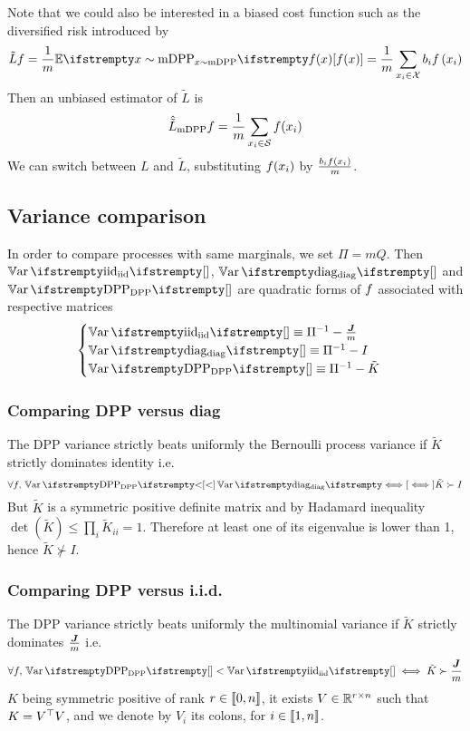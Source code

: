 Note that we could also be interested in a biased cost function such as the diversified risk introduced by \cite{zhang2017dppminibatch}
$$
\tilde L{\query} =\frac{1}{m}\EE{x \sim \textrm{mDPP}}{\query(x)}=\frac{1}{m}\sum_{x_i \in \mathcal X} b_{i} \query\left(x_{i}\right)
$$
Then an unbiased estimator of $\tilde L$ is
\begin{equation*}
	\hat{\tilde L}_{\textrm{mDPP}}{f} = \frac{1}{m}\sum_{x_i\in \mathcal S} f(x_i)
\end{equation*}
We can switch between $L$ and $\tilde L$, substituting $f(x_i)$ by $\frac{b_i f(x_i)}{m}$.


\subsection{Variance comparison}
In order to compare processes with same marginals, we set $\Pi = mQ$. Then $\Var{\textrm{iid}}{}$, $\Var{\textrm{diag}}{}$ and $\Var{\textrm{DPP}}{}$ are quadratic forms of $f$ associated with respective matrices
$$\begin{cases}
	\Var{\textrm{iid}}{} \equiv \Pi^{-1} - \frac{\moones}{m} \\
	\Var{\textrm{diag}}{} \equiv \Pi^{-1} - I \\
	\Var{\textrm{DPP}}{} \equiv \Pi^{-1} - \tilde K
\end{cases}$$

\subsubsection{Comparing DPP versus diag}
The DPP variance strictly beats uniformly the Bernoulli process variance if $\tilde K$ strictly dominates identity i.e. 
\begin{equation}
	\forall \query, \, \Var{\textrm{DPP}} < \Var{\textrm{diag}} \iff \tilde K \succ I
\end{equation}
But $\tilde K$ is a symmetric positive definite matrix and by Hadamard inequality $\det( \tilde K) \leq \prod_{i} \tilde K_{ii}= 1$. Therefore at least one of its eigenvalue is lower than 1, hence $\tilde K \nsucc I$.

\subsubsection{Comparing DPP versus i.i.d.}
The DPP variance strictly beats uniformly the multinomial variance if $\tilde K$ strictly dominates $\frac{\boldsymbol{J}}{m}$ i.e. 
\begin{equation}
	\forall \query, \, \Var{\textrm{DPP}}{} < \Var{\textrm{iid}}{} \iff \tilde K \succ \frac{\moones}{m}
\end{equation}
$K$ being symmetric positive of rank $r \in \llbracket 0,n \rrbracket$, it exists $V \in \mathbb{R}^{r \times n}$ such that $K = V^\top V$, and we denote by $V_i$ its colons, for $i \in \llbracket 1,n \rrbracket$.

